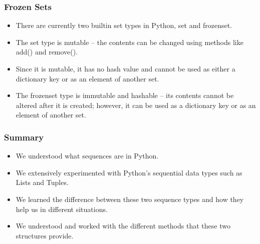 \documentclass{beamer}
\begin{document}
\begin{frame}
\frametitle{Frozen Sets}
\begin{itemize}
\item There are currently two builtin set types in Python, set and frozenset. 
\item The set type is mutable -- the contents can be changed using methods like add() and remove(). 
\item Since it is mutable, it has no hash value and cannot be used as either a dictionary key or as an element of another set. 
\item The frozenset type is immutable and hashable -- its contents cannot be altered after it is created; however, it can be used as a dictionary key or as an element of another set.
\end{itemize}
\end{frame}

\begin{frame}
\frametitle{Summary}
\begin{itemize}
\item We understood what sequences are in Python.
\item We extensively experimented with Python's sequential data types such as Lists and Tuples.
\item We learned the difference between these two sequence types and how they help us in different situations.
\item We understood and worked with the different methods that these two structures provide.
\end{itemize}
\end{frame}
\end{document}
